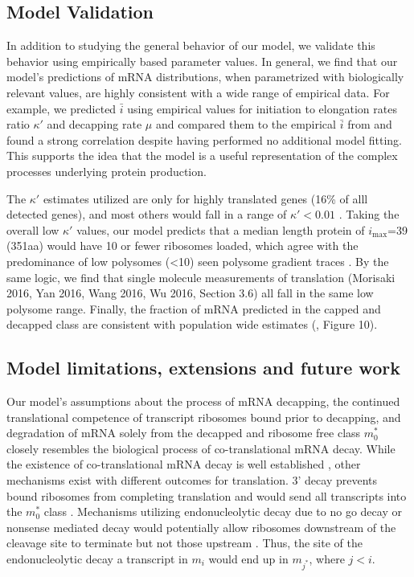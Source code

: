 \documentclass[a4,center,fleqn]{NAR}
\newcommand{\imax}{\ensuremath{{i_{\max}}}\xspace}
\newcommand{\MRL}{\ensuremath{\bar{i}}\xspace}
\begin{document}
\subsection{Model Validation}

In addition to studying the general behavior of our model, we validate this behavior using empirically based parameter values.
In general, we find that our model's predictions of mRNA distributions, when parametrized with biologically relevant values, are highly consistent with a wide range of empirical data.
For example, we predicted \MRL using empirical values for initiation to elongation rates ratio $\kappa'$ \citep{RN13} and decapping rate $\mu$ \citep{RN27} and compared them to the empirical \MRL from \citep{RN29} and found a strong correlation despite having performed no additional model fitting. This supports the idea that the model is a useful representation of the complex processes underlying protein production.

The $\kappa'$ estimates utilized are only for highly translated genes (16\% of alll detected genes), and most others would fall in a range of $\kappa'<0.01$ \citep{RN13}.
Taking the overall low $\kappa'$ values, our model predicts that a median length protein of \imax =39 (351aa) would have 10 or fewer ribosomes loaded, which agree with the predominance of low polysomes (<10) seen polysome gradient traces \citep{RN35, RN36}. 
By the same logic, we find that single molecule measurements of translation \citep{RN30,RN32,RN33,RN31} (Morisaki 2016, Yan 2016, Wang 2016, Wu 2016, Section 3.6) all fall in the same low polysome range.
Finally, the fraction of mRNA predicted in the capped and decapped class  are consistent with population wide estimates (\citep{RN4}, Figure 10). 


\subsection{Model limitations, extensions and future work}

Our model's assumptions about the process of mRNA decapping, the continued translational competence of transcript ribosomes bound prior to decapping, and degradation of mRNA solely from the decapped and ribosome free class $m_0^*$  closely resembles the biological process of co-translational mRNA decay. While the existence of co-translational mRNA decay is well established \citep{RN4,RN28}, other mechanisms exist with different outcomes for translation. 3' decay prevents bound ribosomes from completing translation and would send all transcripts into the $m_0^*$ class . Mechanisms utilizing endonucleolytic decay due to no go decay or nonsense mediated decay would potentially allow ribosomes downstream of the cleavage site to terminate but not those upstream \citep{RN38,RN2}. Thus,  the site of the endonucleolytic decay a transcript in $m_i$ would end up in $m_{j^*}$, where $j < i$.
\end{document}
